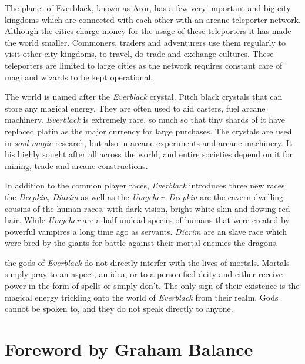 \begin{enumerate}
  The planet of Everblack, known as Aror, has a
 few very important and big city kingdoms which are connected with each other
 with an arcane teleporter network. Although the cities charge money for the
 usage of these teleporters it has made the world smaller. Commoners, traders
 and adventurers use them regularly to visit other city kingdoms, to travel,
 do trade and exchange cultures. These teleporters are limited to large cities
 as the network requires constant care of magi and wizards to be kept
 operational.

  The world is named after the \emph{Everblack} crystal. Pitch
 black crystals that can store any magical energy. They are often used to aid
 casters, fuel arcane machinery. \emph{Everblack} is extremely rare, so much so
 that tiny shards of it have replaced platin as the major currency for large
 purchases. The crystals are used in \emph{soul magic} research, but also in
 arcane experiments and arcane machinery. It his highly sought after all across
 the world, and entire societies depend on it for mining, trade and arcane
 constructions.

  In addition to the common player races, \emph{Everblack}
 introduces three new races: the \emph{Deepkin}, \emph{Diarim} as well as
 the \emph{Umgeher}.  \emph{Deepkin} are the cavern dwelling cousins of the
 human races, with dark vision, bright white skin and flowing red
 hair. While \emph{Umgeher} are a half undead species of humans that were
 created by powerful vampires a long time ago as servants. \emph{Diarim} are
 an slave race which were bred by the giants for battle against their mortal
 enemies the dragons.

  the gods of \emph{Everblack} do not directly
 interfer with the lives of mortals. Mortals simply pray to an aspect, an idea,
 or to a personified deity and either receive power in the form of spells or
 simply don't. The only sign of their existence is the magical energy trickling
 onto the world of \emph{Everblack} from their realm. Gods cannot be spoken to,
 and they do not speak directly to anyone.

\end{enumerate}

\pagebreak

\onecolumn
\section*{Foreword by Graham Balance}

